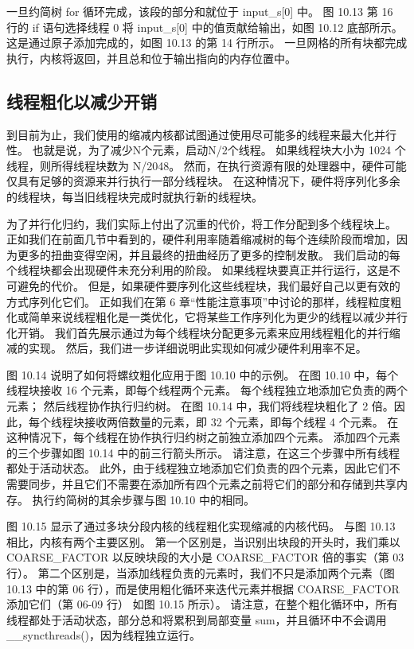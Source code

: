 一旦约简树 for 循环完成，该段的部分和就位于 input\_s[0] 中。 图 10.13 第 16 行的 if 语句选择线程 0 将 input\_s[0] 中的值贡献给输出，如图 10.12 底部所示。 这是通过原子添加完成的，如图 10.13 的第 14 行所示。 一旦网格的所有块都完成执行，内核将返回，并且总和位于输出指向的内存位置中。

\subsection{线程粗化以减少开销}
到目前为止，我们使用的缩减内核都试图通过使用尽可能多的线程来最大化并行性。 也就是说，为了减少N个元素，启动N/2个线程。 如果线程块大小为 1024 个线程，则所得线程块数为 N/2048。 然而，在执行资源有限的处理器中，硬件可能仅具有足够的资源来并行执行一部分线程块。 在这种情况下，硬件将序列化多余的线程块，每当旧线程块完成时就执行新的线程块。

为了并行化归约，我们实际上付出了沉重的代价，将工作分配到多个线程块上。 正如我们在前面几节中看到的，硬件利用率随着缩减树的每个连续阶段而增加，因为更多的扭曲变得空闲，并且最终的扭曲经历了更多的控制发散。 我们启动的每个线程块都会出现硬件未充分利用的阶段。 如果线程块要真正并行运行，这是不可避免的代价。 但是，如果硬件要序列化这些线程块，我们最好自己以更有效的方式序列化它们。 正如我们在第 6 章“性能注意事项”中讨论的那样，线程粒度粗化或简单来说线程粗化是一类优化，它将某些工作序列化为更少的线程以减少并行化开销。 我们首先展示通过为每个线程块分配更多元素来应用线程粗化的并行缩减的实现。 然后，我们进一步详细说明此实现如何减少硬件利用率不足。

图 10.14 说明了如何将螺纹粗化应用于图 10.10 中的示例。 在图 10.10 中，每个线程块接收 16 个元素，即每个线程两个元素。 每个线程独立地添加它负责的两个元素； 然后线程协作执行归约树。 在图 10.14 中，我们将线程块粗化了 2 倍。因此，每个线程块接收两倍数量的元素，即 32 个元素，即每个线程 4 个元素。 在这种情况下，每个线程在协作执行归约树之前独立添加四个元素。 添加四个元素的三个步骤如图 10.14 中的前三行箭头所示。 请注意，在这三个步骤中所有线程都处于活动状态。 此外，由于线程独立地添加它们负责的四个元素，因此它们不需要同步，并且它们不需要在添加所有四个元素之前将它们的部分和存储到共享内存。 执行约简树的其余步骤与图 10.10 中的相同。

图 10.15 显示了通过多块分段内核的线程粗化实现缩减的内核代码。 与图 10.13 相比，内核有两个主要区别。 第一个区别是，当识别出块段的开头时，我们乘以 COARSE\_FACTOR 以反映块段的大小是 COARSE\_FACTOR 倍的事实（第 03 行）。 第二个区别是，当添加线程负责的元素时，我们不只是添加两个元素（图 10.13 中的第 06 行），而是使用粗化循环来迭代元素并根据 COARSE\_FACTOR 添加它们（第 06-09 行） 如图 10.15 所示）。 请注意，在整个粗化循环中，所有线程都处于活动状态，部分总和将累积到局部变量 sum，并且循环中不会调用 \_\_syncthreads()，因为线程独立运行。

